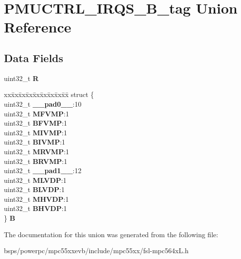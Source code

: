 \hypertarget{unionPMUCTRL__IRQS__32B__tag}{}\section{P\+M\+U\+C\+T\+R\+L\+\_\+\+I\+R\+Q\+S\+\_\+B\+\_\+tag Union Reference}
\label{unionPMUCTRL__IRQS__32B__tag}
\subsection*{Data Fields}
\begin{DoxyCompactItemize}
\item 
\mbox{\label{unionPMUCTRL__IRQS__32B__tag_a58eb349317407de9382055cc15b306e6}} 
uint32\+\_\+t {\bfseries R}
\item 
\mbox{\label{unionPMUCTRL__IRQS__32B__tag_a418a205458f6bddaa988f5e8c7ed572a}} 
\begin{tabbing}
xx\=xx\=xx\=xx\=xx\=xx\=xx\=xx\=xx\=\kill
struct \{\\
\>uint32\_t {\bfseries \_\_pad0\_\_}:10\\
\>uint32\_t {\bfseries MFVMP}:1\\
\>uint32\_t {\bfseries BFVMP}:1\\
\>uint32\_t {\bfseries MIVMP}:1\\
\>uint32\_t {\bfseries BIVMP}:1\\
\>uint32\_t {\bfseries MRVMP}:1\\
\>uint32\_t {\bfseries BRVMP}:1\\
\>uint32\_t {\bfseries \_\_pad1\_\_}:12\\
\>uint32\_t {\bfseries MLVDP}:1\\
\>uint32\_t {\bfseries BLVDP}:1\\
\>uint32\_t {\bfseries MHVDP}:1\\
\>uint32\_t {\bfseries BHVDP}:1\\
\} {\bfseries B}\\

\end{tabbing}\end{DoxyCompactItemize}


The documentation for this union was generated from the following file\+:\begin{DoxyCompactItemize}
\item 
bsps/powerpc/mpc55xxevb/include/mpc55xx/fsl-\/mpc564x\+L.\+h\end{DoxyCompactItemize}
